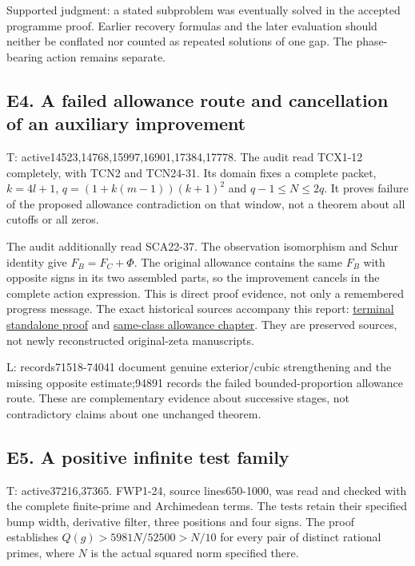 \documentclass[
  british,
  11pt,
  a4paper,
]{article}
\begin{document}
Supported judgment: a stated subproblem was eventually solved in the
accepted programme proof. Earlier recovery formulas and the later
evaluation should neither be conflated nor counted as repeated solutions
of one gap. The phase-bearing action remains separate.

\subsection{E4. A failed allowance route and cancellation of an
auxiliary
improvement}\label{e4.-a-failed-allowance-route-and-cancellation-of-an-auxiliary-improvement}

T: active14523,14768,15997,16901,17384,17778. The audit read TCX1-12
completely, with TCN2 and TCN24-31. Its domain fixes a complete packet,
\(k=4l+1\), \(q=(1+k(m-1))(k+1)^2\) and \(q-1\le N\le2q\). It proves
failure of the proposed allowance contradiction on that window, not a
theorem about all cutoffs or all zeros.

The audit additionally read SCA22-37. The observation isomorphism and
Schur identity give \(F_B=F_C+\Phi\). The original allowance contains
the same \(F_B\) with opposite signs in its two assembled parts, so the
improvement cancels in the complete action expression. This is direct
proof evidence, not only a remembered progress message. The exact
historical sources accompany this report:
\href{https://github.com/KokunoYumeto/zeta-function-research-reader/blob/main/workbenches/splitzero-tandem/research-self-audit/supporting_proofs/Terminal_Adjacent_Window_Standalone.tex}{terminal
standalone proof} and
\href{https://github.com/KokunoYumeto/zeta-function-research-reader/blob/main/workbenches/splitzero-tandem/research-self-audit/supporting_proofs/SAME_CLASS_RELATION_ALLOWANCE.tex}{same-class
allowance chapter}. They are preserved sources, not newly reconstructed
original-zeta manuscripts.

L: records71518-74041 document genuine exterior/cubic strengthening and
the missing opposite estimate;94891 records the failed
bounded-proportion allowance route. These are complementary evidence
about successive stages, not contradictory claims about one unchanged
theorem.

\subsection{E5. A positive infinite test
family}\label{e5.-a-positive-infinite-test-family}

T: active37216,37365. FWP1-24, source lines650-1000, was read and
checked with the complete finite-prime and Archimedean terms. The tests
retain their specified bump width, derivative filter, three positions
and four signs. The proof establishes \(Q(g)>5981N/52500>N/10\) for
every pair of distinct rational primes, where \(N\) is the actual
squared norm specified there.
\end{document}
